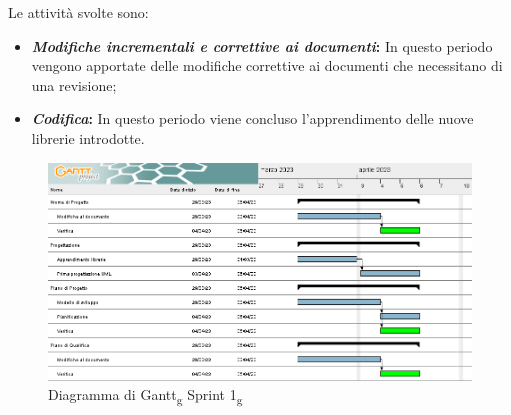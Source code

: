 Le attività svolte sono:
\begin{itemize}
\item \textbf{\textit{Modifiche incrementali e correttive ai documenti}:} In questo periodo vengono apportate
delle modifiche correttive ai documenti che necessitano di una revisione;
\item \textbf{\textit{Codifica}:} In questo periodo viene concluso l'apprendimento delle nuove librerie introdotte.
\end{itemize}

\begin{figure}[H]
    \centering
    \includegraphics[scale=0.56]{image/gantt_sprint1.PNG}
    \caption{Diagramma di Gantt\textsubscript{g} Sprint 1\textsubscript{g}}
\end{figure}

